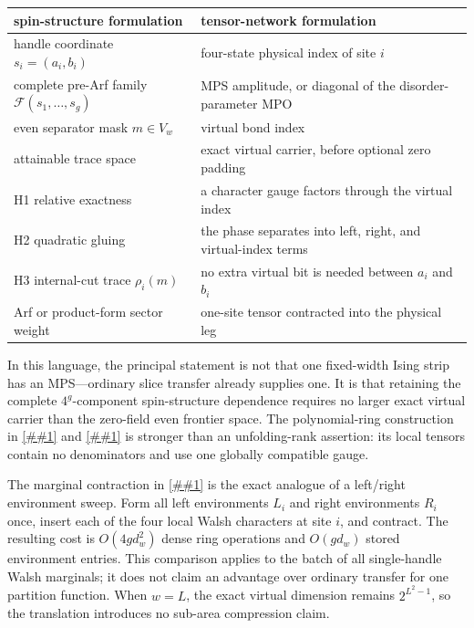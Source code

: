 \documentclass[11pt]{article}
\newcommand{\cref}[1]{\autoref{##1}}%
\newcommand{\cF}{\mathcal F}
\begin{document}
\begin{center}
\small
\begin{tabular}{@{}p{}p{}@{}}
\toprule
spin-structure formulation & tensor-network formulation\\
\midrule
handle coordinate \(s_i=(a_i,b_i)\) & four-state physical index of site \(i\)\\
complete pre-Arf family \(\cF(s_1,\ldots,s_g)\) & MPS amplitude, or diagonal of the disorder-parameter MPO\\
even separator mask \(m\in V_w\) & virtual bond index\\
attainable trace space & exact virtual carrier, before optional zero padding\\
H1 relative exactness & a character gauge factors through the virtual index\\
H2 quadratic gluing & the phase separates into left, right, and virtual-index terms\\
H3 internal-cut trace \(\rho_i(m)\) & no extra virtual bit is needed between \(a_i\) and \(b_i\)\\
Arf or product-form sector weight & one-site tensor contracted into the physical leg\\
\bottomrule
\end{tabular}
\end{center}

In this language, the principal statement is not that one fixed-width Ising
strip has an MPS---ordinary slice transfer already supplies one.  It is that
retaining the complete \(4^g\)-component spin-structure dependence requires no
larger exact virtual carrier than the zero-field even frontier space.  The
polynomial-ring construction in \cref{lem:phase-telescoping} and
\cref{thm:grid-upper}
is stronger than an unfolding-rank assertion: its local tensors contain no
denominators and use one globally compatible gauge.

The marginal contraction in \cref{thm:marginals} is the exact analogue of a
left/right environment sweep.  Form all left environments \(L_i\) and right
environments \(R_i\) once, insert each of the four local Walsh characters at
site \(i\), and contract.  The resulting cost is
\(O(4g d_w^2)\) dense ring operations and \(O(gd_w)\) stored environment
entries.  This comparison applies to the batch of all single-handle Walsh
marginals; it does not claim an advantage over ordinary transfer for one
partition function.  When \(w=L\), the exact virtual dimension remains
\(2^{L^2-1}\), so the translation introduces no sub-area compression claim.
\end{document}
